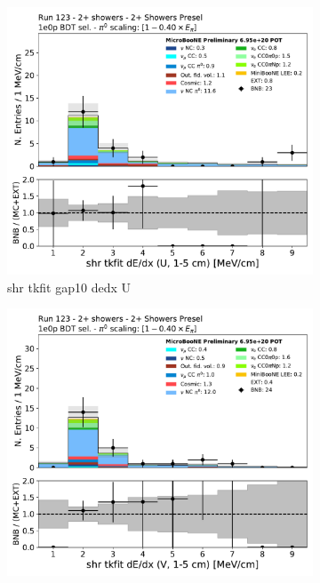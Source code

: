 \begin{figure}[H]
    \centering
    \begin{subfigure}{0.3\textwidth}
    \includegraphics[width=1.0\textwidth]{Sidebands/Figures/TwoShr_1e0pSel/BDT/shr_tkfit_gap10_dedx_U.pdf}
    \caption{shr tkfit gap10 dedx U}
    \end{subfigure}
    \begin{subfigure}{0.3\textwidth}
    \includegraphics[width=1.0\textwidth]{Sidebands/Figures/TwoShr_1e0pSel/BDT/shr_tkfit_gap10_dedx_V.pdf}

\end{subfigure}
\end{figure}
